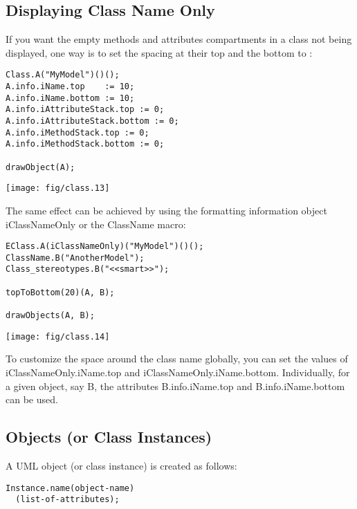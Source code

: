 \documentclass{article}
\newcommand{\code}{\ttfamily}
\begin{document}
\subsection{Displaying Class Name Only}

If you want the empty methods and attributes compartments in a class not being displayed, one way is to set the spacing
at their top and the bottom to {\code 0}:
\begin{samepage}
\begin{multicols}{2}
\begin{verbatim}
Class.A("MyModel")()();
A.info.iName.top    := 10;
A.info.iName.bottom := 10;
A.info.iAttributeStack.top := 0;
A.info.iAttributeStack.bottom := 0;
A.info.iMethodStack.top := 0;
A.info.iMethodStack.bottom := 0;

drawObject(A);
\end{verbatim}
\columnbreak
\hspace{1cm}\texttt{[image: fig/class.13]}
\end{multicols}
\end{samepage}

The same effect can be achieved by using the formatting information object {\code iClassNameOnly} or the {\code ClassName} macro:

\begin{multicols}{2}
\begin{verbatim}
EClass.A(iClassNameOnly)("MyModel")()();
ClassName.B("AnotherModel");
Class_stereotypes.B("<<smart>>");

topToBottom(20)(A, B);

drawObjects(A, B);
\end{verbatim}
\columnbreak
\hspace{2cm}\texttt{[image: fig/class.14]}
\end{multicols}

To customize the space around the class name globally, you can set the values of {\code iClassNameOnly.iName.top} and {\code iClassNameOnly.iName.bottom}. Individually, for a given object, say {\code B}, the attributes {\code B.info.iName.top} and {\code B.info.iName.bottom} can be used.

\subsection{Objects (or Class Instances)}

A UML object (or class instance) is created as follows:

\begin{verbatim}
Instance.name(object-name)
  (list-of-attributes);
\end{verbatim}
\end{document}
